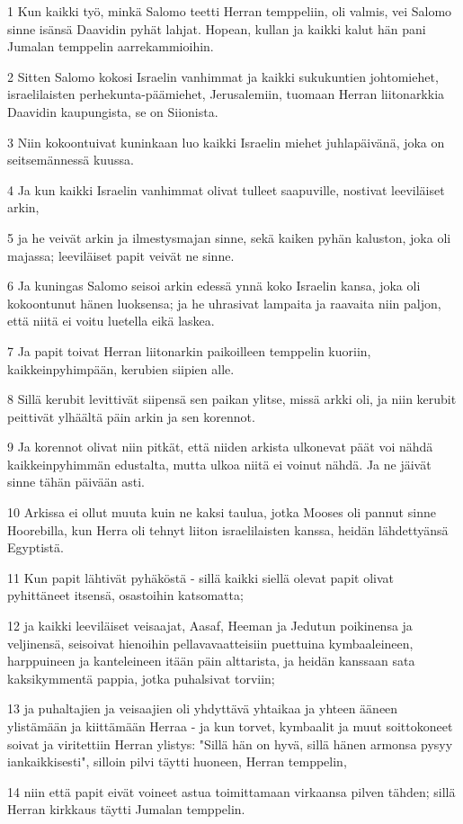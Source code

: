 \par 1 Kun kaikki työ, minkä Salomo teetti Herran temppeliin, oli valmis, vei Salomo sinne isänsä Daavidin pyhät lahjat. Hopean, kullan ja kaikki kalut hän pani Jumalan temppelin aarrekammioihin.
\par 2 Sitten Salomo kokosi Israelin vanhimmat ja kaikki sukukuntien johtomiehet, israelilaisten perhekunta-päämiehet, Jerusalemiin, tuomaan Herran liitonarkkia Daavidin kaupungista, se on Siionista.
\par 3 Niin kokoontuivat kuninkaan luo kaikki Israelin miehet juhlapäivänä, joka on seitsemännessä kuussa.
\par 4 Ja kun kaikki Israelin vanhimmat olivat tulleet saapuville, nostivat leeviläiset arkin,
\par 5 ja he veivät arkin ja ilmestysmajan sinne, sekä kaiken pyhän kaluston, joka oli majassa; leeviläiset papit veivät ne sinne.
\par 6 Ja kuningas Salomo seisoi arkin edessä ynnä koko Israelin kansa, joka oli kokoontunut hänen luoksensa; ja he uhrasivat lampaita ja raavaita niin paljon, että niitä ei voitu luetella eikä laskea.
\par 7 Ja papit toivat Herran liitonarkin paikoilleen temppelin kuoriin, kaikkeinpyhimpään, kerubien siipien alle.
\par 8 Sillä kerubit levittivät siipensä sen paikan ylitse, missä arkki oli, ja niin kerubit peittivät ylhäältä päin arkin ja sen korennot.
\par 9 Ja korennot olivat niin pitkät, että niiden arkista ulkonevat päät voi nähdä kaikkeinpyhimmän edustalta, mutta ulkoa niitä ei voinut nähdä. Ja ne jäivät sinne tähän päivään asti.
\par 10 Arkissa ei ollut muuta kuin ne kaksi taulua, jotka Mooses oli pannut sinne Hoorebilla, kun Herra oli tehnyt liiton israelilaisten kanssa, heidän lähdettyänsä Egyptistä.
\par 11 Kun papit lähtivät pyhäköstä - sillä kaikki siellä olevat papit olivat pyhittäneet itsensä, osastoihin katsomatta;
\par 12 ja kaikki leeviläiset veisaajat, Aasaf, Heeman ja Jedutun poikinensa ja veljinensä, seisoivat hienoihin pellavavaatteisiin puettuina kymbaaleineen, harppuineen ja kanteleineen itään päin alttarista, ja heidän kanssaan sata kaksikymmentä pappia, jotka puhalsivat torviin;
\par 13 ja puhaltajien ja veisaajien oli yhdyttävä yhtaikaa ja yhteen ääneen ylistämään ja kiittämään Herraa - ja kun torvet, kymbaalit ja muut soittokoneet soivat ja viritettiin Herran ylistys: "Sillä hän on hyvä, sillä hänen armonsa pysyy iankaikkisesti", silloin pilvi täytti huoneen, Herran temppelin,
\par 14 niin että papit eivät voineet astua toimittamaan virkaansa pilven tähden; sillä Herran kirkkaus täytti Jumalan temppelin.

